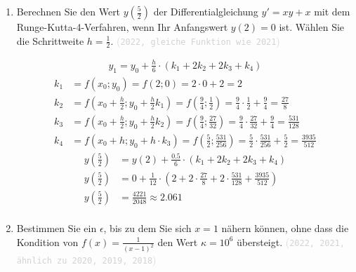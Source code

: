\documentclass[12pt]{article}
\newcommand{\kommentarMacro}[1]{\textcolor{lightgray}{(\texttt{#1})}}
\begin{document}
\begin{enumerate}
    \item Berechnen Sie den Wert $y(\frac{5}{2})$ der Differentialgleichung $y' = xy + x$ mit dem Runge-Kutta-4-Verfahren, wenn Ihr Anfangswert $y(2) = 0$ ist. Wählen Sie die Schrittweite $h = \frac{1}{2}$. \kommentarMacro{2022, gleiche Funktion wie 2021}
          \begin{solution}
              \begin{align*}
                  y_1 = y_0 + \frac{h}{6} \cdot ( k_1 + 2k_2 + 2k_3 + k_4 )
              \end{align*}
              \begin{align*}
                  k_1 & = f(x_0; y_0) = f\left(2;0\right) = 2\cdot 0 + 2 = 2                                                                                                     \\
                  k_2 & = f(x_0 + \frac{h}{2}; y_0 + \frac{h}{2}k_1) = f\left(\frac{9}{4};\frac{1}{2}\right) = \frac{9}{4} \cdot \frac{1}{2} + \frac{9}{4} = \frac{27}{8}        \\
                  k_3 & = f(x_0 + \frac{h}{2}; y_0 + \frac{h}{2}k_2) = f\left(\frac{9}{4};\frac{27}{32}\right) = \frac{9}{4} \cdot \frac{27}{32} + \frac{9}{4} = \frac{531}{128} \\
                  k_4 & = f(x_0 + h; y_0 + h\cdot k_3) = f\left(\frac{5}{2};\frac{531}{256}\right) = \frac{5}{2} \cdot \frac{531}{256} + \frac{5}{2} = \frac{3935}{512}
              \end{align*}
              \begin{align*}
                  y\left(\frac{5}{2}\right) & = y\left(2\right) + \frac{0.5}{6} \cdot \left(k_1 + 2k_2 + 2k_3 + k_4\right)                                \\
                  y\left(\frac{5}{2}\right) & = 0 + \frac{1}{12} \cdot \left(2 + 2 \cdot \frac{27}{8} + 2 \cdot \frac{531}{128} + \frac{3935}{512}\right) \\
                  y\left(\frac{5}{2}\right) & = \frac{4221}{2048} \approx 2.061                                                                           \\
              \end{align*}
          \end{solution}
    \item Bestimmen Sie ein $\epsilon$, bis zu dem Sie sich $x=1$ nähern können, ohne dass die Kondition von $f(x) = \frac{1}{(x-1)^2}$ den Wert $\kappa = 10^6$ übersteigt. \kommentarMacro{2022, 2021, ähnlich zu 2020, 2019, 2018}


\end{enumerate}
\end{document}
